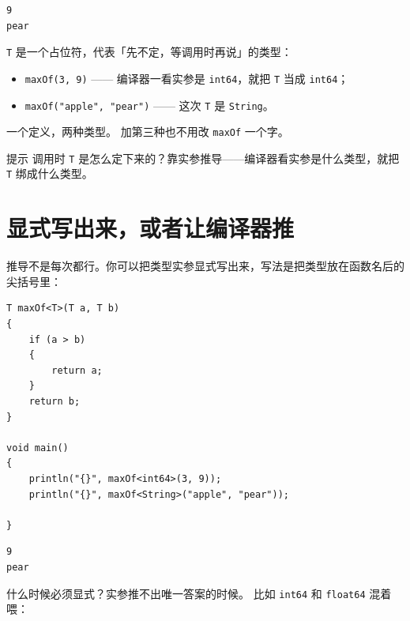 \par
\medskip
\begin{lstlisting}[style=out]
9
pear
\end{lstlisting}
\par
\medskip

\texttt{T} 是一个占位符，代表「先不定，等调用时再说」的类型：

\begin{itemize}

\item \texttt{max\allowbreak{}Of(\allowbreak{}3,\allowbreak{} 9)\allowbreak{}} —— 编译器一看实参是 \texttt{int64}，就把 \texttt{T} 当成 \texttt{int64}；

\item \texttt{max\allowbreak{}Of(\allowbreak{}"apple",\allowbreak{} "pear")\allowbreak{}} —— 这次 \texttt{T} 是 \texttt{String}。

\end{itemize}

一个定义，两种类型。 加第三种也不用改 \texttt{max\allowbreak{}Of} 一个字。

\begin{tip}{提示}
调用时 \texttt{T} 是怎么定下来的？靠实参推导——编译器看实参是什么类型，就把 \texttt{T} 绑成什么类型。
\end{tip}

\section{显式写出来，或者让编译器推}

推导不是每次都行。你可以把类型实参显式写出来，写法是把类型放在函数名后的尖括号里：

\par
\medskip
\begin{lstlisting}[style=chali]
T maxOf<T>(T a, T b)
{
    if (a > b)
    {
        return a;
    }
    return b;
}

void main()
{
    println("{}", maxOf<int64>(3, 9));
    println("{}", maxOf<String>("apple", "pear"));

}
\end{lstlisting}
\par
\medskip

\par
\medskip
\begin{lstlisting}[style=out]
9
pear
\end{lstlisting}
\par
\medskip

什么时候必须显式？实参推不出唯一答案的时候。 比如 \texttt{int64} 和 \texttt{float64} 混着喂：


